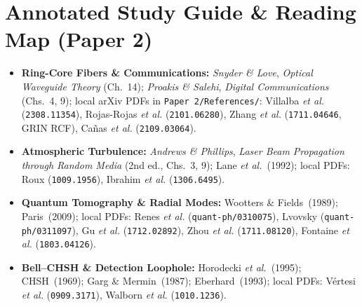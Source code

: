 \documentclass[10pt,letterpaper]{article}
\numberwithin{equation}{section}
\begin{document}
\section*{Annotated Study Guide \& Reading Map (Paper 2)}
\begin{itemize}[leftmargin=1.4em,itemsep=2pt]
  \item \textbf{Ring-Core Fibers \& Communications:} \emph{Snyder \& Love}, \emph{Optical Waveguide Theory} (Ch.~14); \emph{Proakis \& Salehi}, \emph{Digital Communications} (Chs.~4, 9); local arXiv PDFs in \texttt{Paper 2/References/}: Villalba \emph{et al.} (\texttt{2308.11354}), Rojas-Rojas \emph{et al.} (\texttt{2101.06280}), Zhang \emph{et al.} (\texttt{1711.04646}, GRIN RCF), Ca\~nas \emph{et al.} (\texttt{2109.03064}).
  \item \textbf{Atmospheric Turbulence:} \emph{Andrews \& Phillips}, \emph{Laser Beam Propagation through Random Media} (2nd ed., Chs.~3, 9); Lane \emph{et al.}~(1992); local PDFs: Roux (\texttt{1009.1956}), Ibrahim \emph{et al.} (\texttt{1306.6495}).
  \item \textbf{Quantum Tomography \& Radial Modes:} Wootters \& Fields~(1989); Paris~(2009); local PDFs: Renes \emph{et al.} (\texttt{quant-ph/0310075}), Lvovsky (\texttt{quant-ph/0311097}), Gu \emph{et al.} (\texttt{1712.02892}), Zhou \emph{et al.} (\texttt{1711.08120}), Fontaine \emph{et al.} (\texttt{1803.04126}).
  \item \textbf{Bell--CHSH \& Detection Loophole:} Horodecki \emph{et al.}~(1995); CHSH~(1969); Garg \& Mermin~(1987); Eberhard~(1993); local PDFs: V\'ertesi \emph{et al.} (\texttt{0909.3171}), Walborn \emph{et al.} (\texttt{1010.1236}).
\end{itemize}
\end{document}
